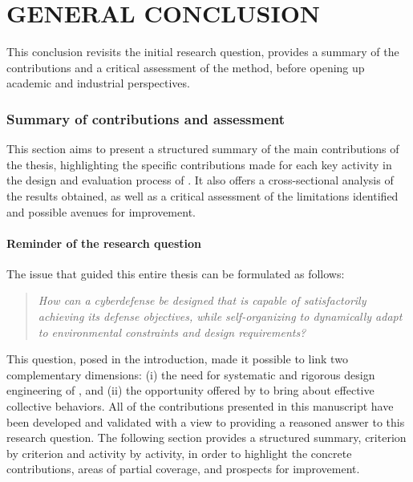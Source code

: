 \clearpage
\thispagestyle{empty}
\null
\newpage
\cleardoublepage
{}
\part*{GENERAL CONCLUSION}
\label{part:conclusion}
\clearpage
\thispagestyle{empty}
\null
\newpage

\noindent
This conclusion revisits the initial research question, provides a summary of the contributions and a critical assessment of the  method, before opening up academic and industrial perspectives.
\section*{Summary of contributions and assessment}
\label{sec:summary_assessment}
\noindent
This section aims to present a structured summary of the main contributions of the thesis, highlighting the specific contributions made for each key activity in the design and evaluation process of . It also offers a cross-sectional analysis of the results obtained, as well as a critical assessment of the limitations identified and possible avenues for improvement.
\subsection*{Reminder of the research question}
\noindent
The issue that guided this entire thesis can be formulated as follows:
\begin {quote}
\emph{How can a cyberdefense  be designed that is capable of satisfactorily achieving its defense objectives, while self-organizing to dynamically adapt to environmental constraints and design requirements?}
\end{quote}
\noindent
This question, posed in the introduction, made it possible to link two complementary dimensions:
(i) the need for systematic and rigorous design engineering of , and
(ii) the opportunity offered by  to bring about effective collective behaviors.
All of the contributions presented in this manuscript have been developed and validated with a view to providing a reasoned answer to this research question. The following section provides a structured summary, criterion by criterion and activity by activity, in order to highlight the concrete contributions, areas of partial coverage, and prospects for improvement.

